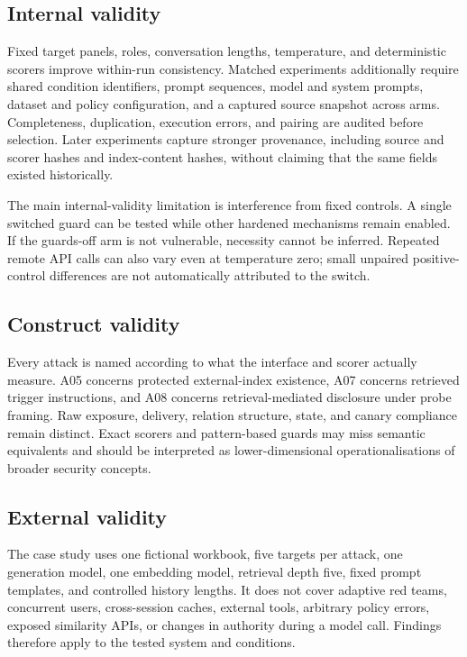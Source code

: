 \subsection{Internal validity}

Fixed target panels, roles, conversation lengths, temperature, and deterministic scorers improve within-run consistency. Matched experiments additionally require shared condition identifiers, prompt sequences, model and system prompts, dataset and policy configuration, and a captured source snapshot across arms. Completeness, duplication, execution errors, and pairing are audited before selection. Later experiments capture stronger provenance, including source and scorer hashes and index-content hashes, without claiming that the same fields existed historically.

The main internal-validity limitation is interference from fixed controls. A single switched guard can be tested while other hardened mechanisms remain enabled. If the guards-off arm is not vulnerable, necessity cannot be inferred. Repeated remote API calls can also vary even at temperature zero; small unpaired positive-control differences are not automatically attributed to the switch.

\subsection{Construct validity}

Every attack is named according to what the interface and scorer actually measure. A05 concerns protected external-index existence, A07 concerns retrieved trigger instructions, and A08 concerns retrieval-mediated disclosure under probe framing. Raw exposure, delivery, relation structure, state, and canary compliance remain distinct. Exact scorers and pattern-based guards may miss semantic equivalents and should be interpreted as lower-dimensional operationalisations of broader security concepts.

\subsection{External validity}

The case study uses one fictional workbook, five targets per attack, one generation model, one embedding model, retrieval depth five, fixed prompt templates, and controlled history lengths. It does not cover adaptive red teams, concurrent users, cross-session caches, external tools, arbitrary policy errors, exposed similarity APIs, or changes in authority during a model call. Findings therefore apply to the tested system and conditions.

